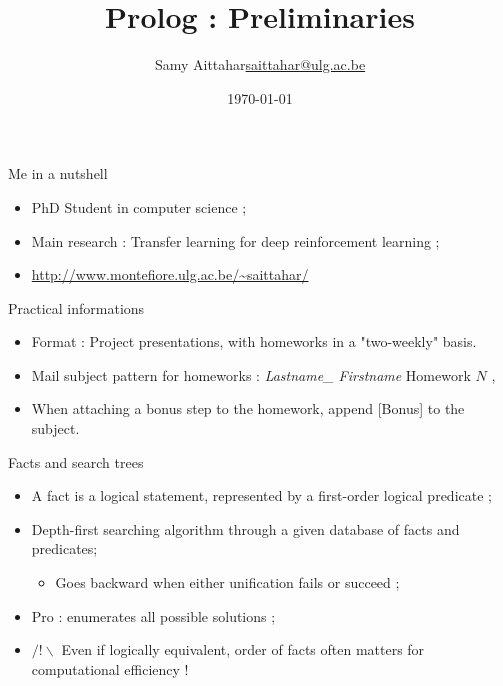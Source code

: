 \documentclass[11pt]{beamer}
\author{\texorpdfstring{Samy Aittahar\newline\url{saittahar@ulg.ac.be}}{Samy Aittahar}}
\title{Prolog : Preliminaries}
\institute{University of Liège}
\date{\today}
\begin{document}
\lstset{language=Prolog}  
\begin{frame}
\titlepage
\end{frame}


\begin{frame}{Me in a nutshell}

	\begin{itemize}
	
		\item PhD Student in computer science ;
		\item Main research : Transfer learning for deep reinforcement learning ;
		\item \url{http://www.montefiore.ulg.ac.be/~saittahar/} 
	
	\end{itemize}

\end{frame}

\begin{frame}{Practical informations}
\begin{itemize}
	\item Format : Project presentations, with homeworks in a "two-weekly" basis.
	\item Mail subject pattern for homeworks : \emph{Lastname\_ Firstname} Homework $N$ \;,
	\item When attaching a bonus step to the homework, append [Bonus] to the subject.
\end{itemize}
\end{frame}

\begin{frame}{Facts and search trees}

\begin{itemize}
	\item A fact is a logical statement, represented by a first-order logical predicate ;
	\item Depth-first searching algorithm through a given database of facts and predicates;
	\begin{itemize}
	   \item Goes backward when either unification fails or succeed ;
	\end{itemize}
	\item Pro : enumerates all possible solutions ;
	\item $/!\backslash $ Even if logically equivalent, order of facts often matters for computational efficiency !
	\end{itemize}

\end{frame}
\end{document}
